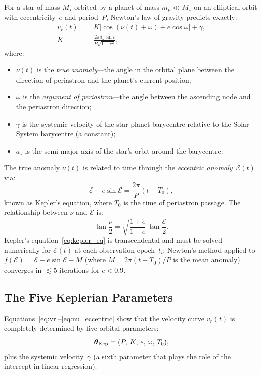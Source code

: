 \documentclass[12pt]{article}
\begin{document}
For a star of mass $M_\star$ orbited by a planet of mass $m_p \ll M_\star$
on an elliptical orbit with eccentricity~$e$ and period~$P$, Newton's
law of gravity predicts exactly:
\begin{align}
  v_r(t) &= K\bigl[\cos(\nu(t)+\omega) + e\cos\omega\bigr] + \gamma,
  \label{eq:vr}\\[4pt]
  K &= \frac{2\pi a_\star \sin i}{P\sqrt{1-e^2}},\label{eq:K_def2}
\end{align}
where:
\begin{itemize}
  \item $\nu(t)$ is the \emph{true anomaly}---the angle in the orbital
    plane between the direction of periastron and the planet's current
    position;
  \item $\omega$ is the \emph{argument of periastron}---the angle
    between the ascending node and the periastron direction;
  \item $\gamma$ is the systemic velocity of the star-planet barycentre
    relative to the Solar System barycentre (a constant);
  \item $a_\star$ is the semi-major axis of the star's orbit around
    the barycentre.
\end{itemize}

The true anomaly $\nu(t)$ is related to time through the
\emph{eccentric anomaly}~$\mathcal{E}(t)$ via:
\begin{equation}\label{eq:kepler_eq}
  \mathcal{E} - e\sin\mathcal{E} = \frac{2\pi}{P}(t - T_0),
\end{equation}
known as Kepler's equation, where $T_0$ is the time of periastron
passage.  The relationship between $\nu$ and $\mathcal{E}$ is:
\begin{equation}\label{eq:nu_eccentric}
  \tan\frac{\nu}{2} = \sqrt{\frac{1+e}{1-e}}\,\tan\frac{\mathcal{E}}{2}.
\end{equation}
Kepler's equation~\eqref{eq:kepler_eq} is transcendental and must be
solved numerically for $\mathcal{E}(t)$ at each observation epoch~$t_i$;
Newton's method applied to $f(\mathcal{E}) = \mathcal{E} - e\sin\mathcal{E}
- M$ (where $M = 2\pi(t-T_0)/P$ is the mean anomaly) converges in
$\lesssim 5$ iterations for $e < 0.9$.

\subsection{The Five Keplerian Parameters}

Equations~\eqref{eq:vr}--\eqref{eq:nu_eccentric} show that the
velocity curve $v_r(t)$ is completely determined by five orbital
parameters:
\begin{equation}\label{eq:param_vec}
  \boldsymbol{\theta}_{\rm Kep} = (P,\,K,\,e,\,\omega,\,T_0),
\end{equation}
plus the systemic velocity~$\gamma$ (a sixth parameter that plays the
role of the intercept in linear regression).
\end{document}
